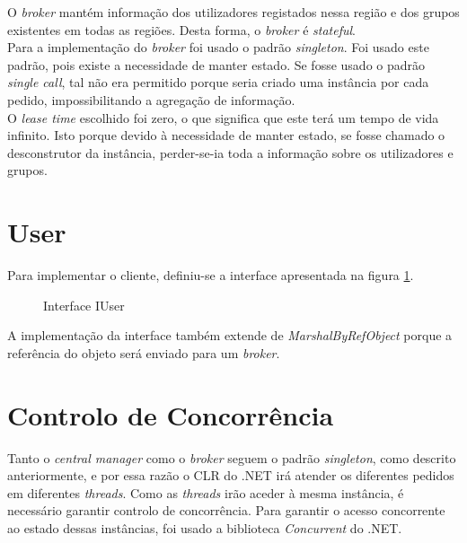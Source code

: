 O \textit{broker} mantém informação dos utilizadores registados nessa região e dos grupos existentes em todas as regiões. Desta forma, o \textit{broker} é \textit{stateful}.\\

Para a implementação do \textit{broker} foi usado o padrão \textit{singleton}. Foi usado este padrão, pois existe a necessidade de manter estado. Se fosse usado o padrão \textit{single call}, tal não era permitido porque seria criado uma instância por cada pedido, impossibilitando a agregação de informação.\\

O \textit{lease time} escolhido foi zero, o que significa que este terá um tempo de vida infinito. Isto porque devido à necessidade de manter estado, se fosse chamado o desconstrutor da instância, perder-se-ia toda a informação sobre os utilizadores e grupos.\\

\section{User} \label{user}

Para implementar o cliente, definiu-se a interface apresentada na figura \ref{iuser}.

\begin{figure}[h]
	\caption{Interface IUser}
	\label{iuser}
\end{figure}

A implementação da interface também extende de \textit{MarshalByRefObject} porque a referência do objeto será enviado para um \textit{broker}.\\ 

\section{Controlo de Concorrência} \label{concorrencia}

Tanto o \textit{central manager} como o \textit{broker} seguem o padrão \textit{singleton}, como descrito anteriormente, e por essa razão o CLR do .NET irá atender os diferentes pedidos em diferentes \textit{threads}. Como as \textit{threads} irão aceder à mesma instância, é necessário garantir controlo de concorrência. Para garantir o acesso concorrente ao estado dessas instâncias, foi usado a biblioteca \textit{Concurrent} do .NET.\\

